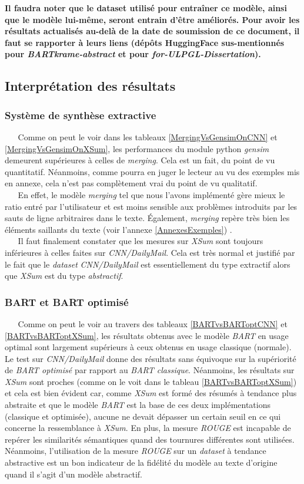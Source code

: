 \textbf{Il faudra noter que le dataset utilisé pour entraîner ce modèle, ainsi que le modèle lui-même, seront entrain d'être améliorés. Pour avoir les résultats actualisés au-delà de la date de soumission de ce document, il faut se rapporter à leurs liens (dépôts HuggingFace sus-mentionnés pour \textit{BARTkrame-abstract} et pour \textit{for-ULPGL-Dissertation}).}
\subsection{Interprétation des résultats}
\subsubsection{Système de synthèse extractive}
$ _{} $ $ _{} $ $ _{} $ $ _{} $ $ _{} $Comme on peut le voir dans les tableaux \ref{MergingVsGensimOnCNN} et \ref{MergingVsGensimOnXSum}, les performances du module python \textit{gensim} demeurent supérieures à celles de \textit{merging}. Cela est un fait, du point de vu quantitatif. Néanmoins, comme pourra en juger le lecteur au vu des exemples mis en annexe, cela n'est pas complètement vrai du point de vu qualitatif.\\
$ _{} $ $ _{} $ $ _{} $ $ _{} $ $ _{} $En effet, le modèle \textit{merging} tel que nous l'avons implémenté gère mieux le ratio entré par l'utilisateur et est moins sensible aux problèmes introduits par les sauts de ligne arbitraires dans le texte. Également, \textit{merging} repère très bien les éléments saillants du texte (voir l'annexe \ref{AnnexesExemples}) .\\
$ _{} $ $ _{} $ $ _{} $ $ _{} $ $ _{} $Il faut finalement constater que les mesures sur \textit{XSum} sont toujours inférieures à celles faites sur \textit{CNN/DailyMail}. Cela est très normal et justifié par le fait que le \textit{dataset} \textit{CNN/DailyMail} est essentiellement du type extractif alors que \textit{XSum} est du type \textit{abstractif}.
\subsubsection{BART et BART optimisé}
$ _{} $ $ _{} $ $ _{} $ $ _{} $ $ _{} $Comme on peut le voir au travers des tableaux \ref{BARTvsBARToptCNN} et \ref{BARTvsBARToptXSum}, les résultats obtenus avec le modèle \textit{BART} en usage optimal sont largement supérieurs à ceux obtenus en usage classique (normale). Le test sur \textit{CNN/DailyMail} donne des résultats sans équivoque sur la supériorité de \textit{BART optimisé} par rapport au \textit{BART classique}. Néanmoins, les résultats sur \textit{XSum} sont proches (comme on le voit dans le tableau \ref{BARTvsBARToptXSum}) et cela est bien évident car, comme \textit{XSum} est formé des résumés à tendance plus abstraite et que le modèle \textit{BART} est la base de ces deux implémentations (classique et optimisée), aucune ne devait dépasser un certain seuil en ce qui concerne la ressemblance à \textit{XSum}. En plus, la mesure \textit{ROUGE} est incapable de repérer les similarités sémantiques quand des tournures différentes sont utilisées. Néanmoins, l'utilisation de la mesure \textit{ROUGE} sur un \textit{dataset} à tendance abstractive est un bon indicateur de la fidélité du modèle au texte d'origine quand il s'agit d'un modèle abstractif.
